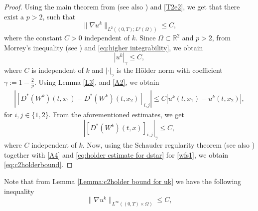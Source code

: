 \documentclass[11pt]{article}
\newcommand{\timeint}{(0,T)}
\begin{document}
\begin{proof}
Using the main theorem from \cite{naumann2005global} (see also \cite{naumann2005interior}) and \eqref{T2e2}, we get that there exist a $p>2$, such that
\begin{equation}\label{eq:higher integrability}
     \|\nabla u^{k}\|_{L^{2}(\timeint;L^p(\Omega))}\leq C,
\end{equation}
where the constant $C>0$ independent of $k$.
Since $\Omega\subset \mathbb{R}^2$ and $p>2$, from Morrey's inequality (see \cite[Theorem 9.12]{brezis2011functional}) and \eqref{eq:higher integrability}, we obtain 
 \begin{equation}\label{eq:holder continuity for uk}
     |u^k|_{\gamma}\leq C,
 \end{equation}
 where $C$ is independent of $k$ and $|\cdot|_{\gamma}$ is the Hölder norm with coefficient $\gamma:=1-\frac{2}{p}$.
Using Lemma \ref{L3}, and \ref{A2},  we obtain
\begin{align}
    |[D^*(W^{k})(t,x_1) -D^*(W^{k})(t,x_2)]_{i,j}|\leq C|u^k(t,x_1)-u^{k}(t,x_2)|,
\end{align}
for $i,j\in\{1,2\}$.
From the aforementioned estimates, we get
\begin{equation}\label{eq:holder estimate for dstar}
     |[D^*(W^k)(t,x)]_{i,j}|_{\gamma}\leq C,
\end{equation}
 where $C$ independent of $k$. Now, using the Schauder regularity theorem \cite[Theorem 5.14]{lieberman1996second} (see also \cite{lunardi1998schauder}) together with \ref{A4} and \eqref{eq:holder estimate for dstar} for \eqref{wfs1}, we obtain \eqref{eq:c2holderbound}.
\end{proof}
%
Note that from Lemma \ref{Lemma:c2holder bound for uk} we have the following inequality
\begin{equation}\label{eq:gradient global bound}
    \|\nabla u^k\|_{L^\infty((0,T)\times\Omega)}\leq C,
\end{equation}
\end{document}
